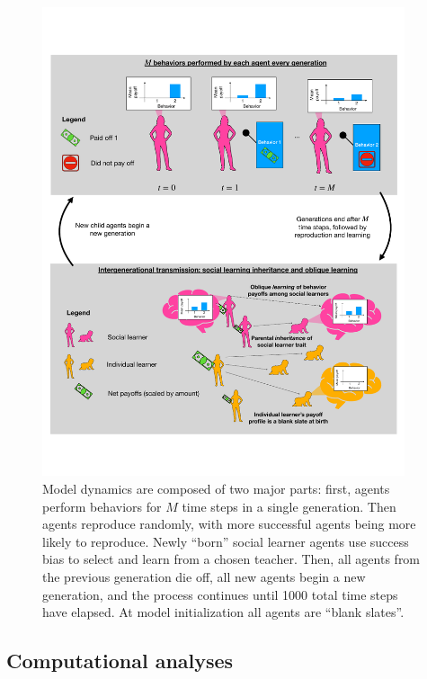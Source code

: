 \documentclass[letterpaper,11.5pt]{scrartcl}
\begin{document}
\begin{figure}
  \centering
    \includegraphics[width=0.95\textwidth]{Figures/IntraInterGenerationalDynamics.pdf}
  \caption{Model dynamics are composed of two major parts: first, agents perform
  behaviors for $M$ time steps in a single generation. Then agents reproduce
  randomly, with more successful agents being more likely to reproduce. Newly
  ``born'' social learner agents use success bias to select and learn from a chosen
  teacher. Then, all agents from the previous generation die off, all new agents
  begin a new generation, and the process continues until 1000 total time steps
  have elapsed. At model initialization all agents are ``blank slates''.}
  \label{fig:IntraInterGenerationalDynamics}
\end{figure}



\subsection{Computational analyses}
\end{document}
